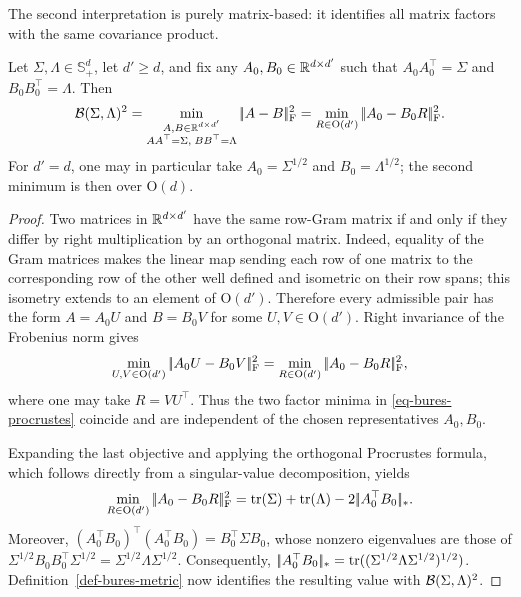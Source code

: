 The second interpretation is purely matrix-based: it identifies all matrix factors with the same covariance product.

\begin{prop}\label{prop-bures-procrustes}
	Let $\Sigma,\Lambda\in\mathbb S_+^d$, let $d'\geq d$, and fix any
	$A_0,B_0\in\mathbb{R}^{d\times d'}$ such that
	$A_0A_0^\top=\Sigma$ and $B_0B_0^\top=\Lambda$. Then
		\begin{equation}\label{eq-bures-procrustes}
			\mathcal{B}(\Sigma,\Lambda)^2
			=
			\min_{\substack{A,B\in\mathbb{R}^{d\times d'}\\
				AA^\top=\Sigma,\;BB^\top=\Lambda}}
			|\!| A-B |\!|_{\mathrm F}^2
			=
			\min_{R\in\mathrm O(d')}|\!| A_0-B_0R |\!|_{\mathrm F}^2.
		\end{equation}
	For $d'=d$, one may in particular take $A_0=\Sigma^{1/2}$ and
	$B_0=\Lambda^{1/2}$; the second minimum is then over $\mathrm O(d)$.
\end{prop}
\begin{proof}
	Two matrices in $\mathbb{R}^{d\times d'}$ have the same row-Gram matrix if and
	only if they differ by right multiplication by an orthogonal matrix. Indeed,
	equality of the Gram matrices makes the linear map sending each row of one
	matrix to the corresponding row of the other well defined and isometric on
	their row spans; this isometry extends to an element of $\mathrm O(d')$.
	Therefore every admissible pair has the form $A=A_0U$ and $B=B_0V$ for
	some $U,V\in\mathrm O(d')$. Right invariance of the Frobenius norm gives
	\[
		\min_{U,V\in\mathrm O(d')}|\!| A_0U-B_0V |\!|_{\mathrm F}^2
		=
		\min_{R\in\mathrm O(d')}|\!| A_0-B_0R |\!|_{\mathrm F}^2,
	\]
	where one may take $R=VU^\top$. Thus the two factor minima in
	\eqref{eq-bures-procrustes} coincide and are independent of the chosen
	representatives $A_0,B_0$.

	Expanding the last objective and applying the orthogonal Procrustes formula,
	which follows directly from a singular-value decomposition, yields
	\[
		\min_{R\in\mathrm O(d')}|\!| A_0-B_0R |\!|_{\mathrm F}^2
		=
		\operatorname{tr}(\Sigma)+\operatorname{tr}(\Lambda)-2|\!| A_0^\top B_0 |\!|_*.
	\]
	Moreover,
	$(A_0^\top B_0)^\top(A_0^\top B_0)=B_0^\top\Sigma B_0$, whose nonzero
	eigenvalues are those of
		$\Sigma^{1/2}B_0B_0^\top\Sigma^{1/2}
		=\Sigma^{1/2}\Lambda\Sigma^{1/2}$. Consequently,
		$|\!| A_0^\top B_0 |\!|_*
		=\operatorname{tr}((\Sigma^{1/2}\Lambda\Sigma^{1/2})^{1/2})$.
	Definition~\ref{def-bures-metric} now identifies the resulting value with
	$\mathcal{B}(\Sigma,\Lambda)^2$.
\end{proof}

